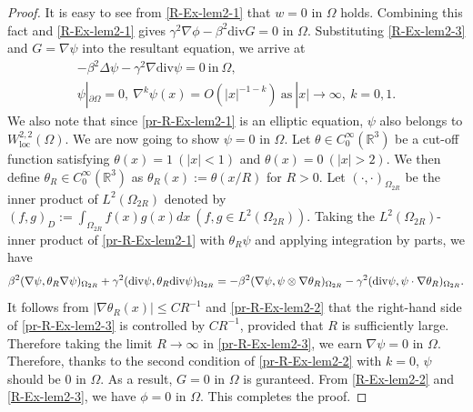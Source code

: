 \documentclass[dvipdfmx,12pt]{article}
\begin{document}
\begin{proof}
It is easy to see from \eqref{R-Ex-lem2-1} that $w=0$ in $\Omega$ holds. Combining this fact and \eqref{R-Ex-lem2-1} gives $\gamma^2\nabla\phi-\beta^2\mathrm{div} G=0$ in $\Omega$. Substituting \eqref{R-Ex-lem2-3} and $G=\nabla\psi$ into the resultant equation, we arrive at
\begin{gather}
-\beta^2\Delta\psi-\gamma^2\nabla\mathrm{div}\psi=0~\mathrm{in}~\Omega, \label{pr-R-Ex-lem2-1} \\
\psi|_{\partial \Omega}=0,~\nabla^k\psi(x)=O(|x|^{-1-k})~\mathrm{as}~|x|\to\infty,~k=0,1. \label{pr-R-Ex-lem2-2}
\end{gather}
We also note that since \eqref{pr-R-Ex-lem2-1} is an elliptic equation, $\psi$ also belongs to $W_{\mathrm{loc}}^{2,2}(\Omega)$.  We are now going to show $\psi=0$ in $\Omega$. Let $\theta\in C_0^\infty(\mathbb{R}^3)$ be a cut-off function satisfying $\theta(x)=1~(|x|<1)$ and  $\theta(x)=0~(|x|>2)$. We then define $\theta_R\in C_0^\infty(\mathbb{R}^3)$ as $\theta_R(x):=\theta(x/R)$ for $R>0$. 
Let $(\cdot,\cdot)_{\Omega_{2R}}$ be the inner product of $L^2(\Omega_{2R})$ denoted by
$
(f,g)_D:=\int_{\Omega_{2R} } f(x)g(x)dx~(f,g\in L^2(\Omega_{2R})).
$
Taking the $L^2(\Omega_{2R} )$-inner product of \eqref{pr-R-Ex-lem2-1} with $\theta_R\psi$ and applying integration by parts, we have
\begin{equation}
\beta^2(\nabla\psi, \theta_R\nabla\psi)_{\Omega_{2R}}+\gamma^2(\mathrm{div}\psi, \theta_R\mathrm{div}\psi)_{\Omega_{2R}} \\
=-\beta^2(\nabla\psi, \psi\otimes\nabla\theta_R)_{\Omega_{2R}}-\gamma^2(\mathrm{div}\psi,\psi\cdot\nabla \theta_R)_{\Omega_{2R}}.
\label{pr-R-Ex-lem2-3}
\end{equation}
It follows from $|\nabla \theta_R(x)|\le CR^{-1}$ and \eqref{pr-R-Ex-lem2-2} that the right-hand side of \eqref{pr-R-Ex-lem2-3} is controlled by $CR^{-1}$, provided that $R$ is sufficiently large. Therefore taking the limit $R\to\infty$ in \eqref{pr-R-Ex-lem2-3}, we earn $\nabla\psi=0$ in $\Omega$. Therefore, thanks to the second condition of \eqref{pr-R-Ex-lem2-2} with $k=0$, $\psi$ should be $0$ in $\Omega$. As a result, $G=0$ in $\Omega$ is guranteed. From \eqref{R-Ex-lem2-2} and \eqref{R-Ex-lem2-3}, we have $\phi=0$ in $\Omega$. This completes the proof. 
\end{proof}
\end{document}
